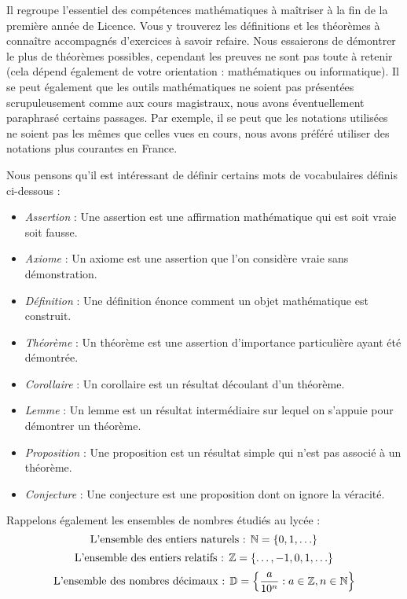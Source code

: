 \par \noindent Il regroupe l'essentiel des compétences mathématiques à maîtriser à la fin de la première année de Licence. Vous y trouverez les définitions et les théorèmes à connaître accompagnés d'exercices à savoir refaire. Nous essaierons de démontrer le plus de théorèmes possibles, cependant les preuves ne sont pas toute à retenir (cela dépend également de votre orientation : mathématiques ou informatique).
Il se peut également que les outils mathématiques ne soient pas présentées scrupuleusement comme aux cours magistraux, nous avons éventuellement paraphrasé certains passages. Par exemple, il se peut que les notations utilisées ne soient pas les mêmes que celles vues en cours, nous avons préféré utiliser des notations plus courantes en France.
\\
\par \noindent Nous pensons qu'il est intéressant de définir certains mots de vocabulaires définis ci-dessous :
\begin{itemize}
    \item \emph{Assertion} : Une assertion est une affirmation mathématique qui est soit vraie soit fausse. 
    \item \emph{Axiome} : Un axiome est une assertion que l'on considère vraie sans démonstration.
    \item \emph{Définition} : Une définition énonce comment un objet mathématique est construit.
    \item \emph{Théorème} : Un théorème est une assertion d'importance particulière ayant été démontrée.
    \item \emph{Corollaire} : Un corollaire est un résultat découlant d'un théorème.
    \item \emph{Lemme} : Un lemme est un résultat intermédiaire sur lequel on s'appuie pour démontrer un théorème.
    \item \emph{Proposition} : Une proposition est un résultat simple qui n'est pas associé à un théorème.
    \item \emph{Conjecture} : Une conjecture est une proposition dont on ignore la véracité.
\end{itemize}
\par \noindent Rappelons également les ensembles de nombres étudiés au lycée :
\[ \text{L'ensemble des entiers naturels : } \mathbb{N} = \{0, 1, \ldots \} \]
\[ \text{L'ensemble des entiers relatifs : } \mathbb{Z} = \{ \ldots, -1, 0, 1, \ldots \} \]
\[ \text{L'ensemble des nombres décimaux : } \mathbb{D} = \left\{ \frac{a}{10^n} : a \in \mathbb{Z}, n \in \mathbb{N} \right\} \]
